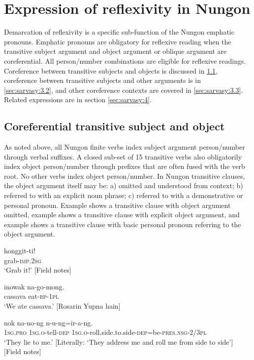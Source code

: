 \documentclass[output=paper,colorlinks,citecolor=brown]{langscibook}
\begin{document}
\section{Expression of reflexivity in Nungon}\label{sec:sarvasy:3}

Demarcation of reflexivity is a specific sub-function of the Nungon emphatic pronouns. Emphatic pronouns are obligatory for reflexive reading when the transitive subject argument and object argument or oblique argument are coreferential. All person/number combinations are eligible for reflexive readings. Coreference between transitive subjects and objects is discussed in \ref{sec:sarvasy:3.1}, coreference between transitive subjects and other arguments is in \ref{sec:sarvasy:3.2}, and other coreference contexts are covered in \ref{sec:sarvasy:3.3}. Related expressions are in section \ref{sec:sarvasy:4}.

\subsection{Coreferential transitive subject and object}\label{sec:sarvasy:3.1}

As noted above, all Nungon finite verbs index subject argument person/number through verbal suffixes. A closed sub-set of 15 transitive verbs also obligatorily index object person/number through prefixes that are often fused with the verb root. No other verbs index object person/number. In Nungon transitive clauses, the object argument itself may be: a) omitted and understood from context; b) referred to with an explicit noun phrase; c) referred to with a demonstrative or personal pronoun. Example  shows a transitive clause with object argument omitted, example  shows a transitive clause with explicit object argument, and example  shows a transitive clause with basic personal pronoun referring to the object argument.

\ea%
    \label{ex:sarvasy:9}
    \gll    honggit-ti!\\
            grab-\textsc{imp.2sg}\\
    \glt    ‘Grab it!’ [Field notes]
\z

\ea%
    \label{ex:sarvasy:10}
    \gll    inowak na-go-mong.\\
            cassava  eat-\textsc{rp-1pl}\\
    \glt    ‘We ate cassava.’ [Rosarin Yupna hain]
\z

\ea%
    \label{ex:sarvasy:11}
    \gll    nok na-no-ng n-u-ng=ir-a-ng.\\
            \textsc{1sg.pro} \textsc{1sg.o}{}-tell-\textsc{dep} \textsc{1sg.o}{}-roll.side.to.side-\textsc{dep}=be-\textsc{pres.nsg-2/3pl}\\
    \glt    ‘They lie to me.’ [Literally: ‘They address me and roll me from side to side’] [Field notes] 
\z
\end{document}
